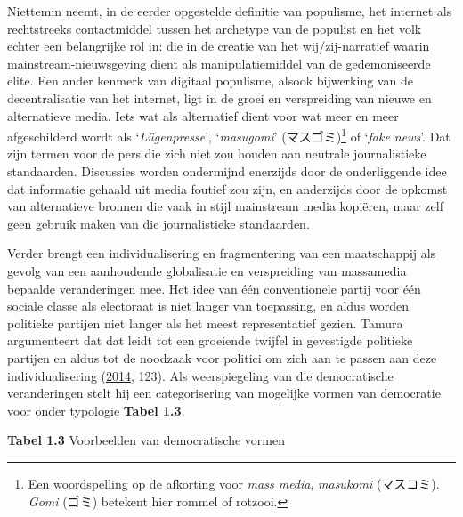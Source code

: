 \documentclass[10.5pt,dutch,]{article}
\begin{document}
Niettemin neemt, in de eerder opgestelde definitie van populisme, het
internet als rechtstreeks contactmiddel tussen het archetype van de
populist en het volk echter een belangrijke rol in: die in de creatie
van het wij/zij-narratief waarin mainstream-nieuwsgeving dient als
manipulatiemiddel van de gedemoniseerde elite. Een ander kenmerk van
digitaal populisme, alsook bijwerking van de decentralisatie van het
internet, ligt in de groei en verspreiding van nieuwe en alternatieve
media. Iets wat als alternatief dient voor wat meer en meer
afgeschilderd wordt als `\emph{Lügenpresse}', `\emph{masugomi}'
(マスゴミ)\footnote{Een woordspelling op de afkorting voor \emph{mass
  media}, \emph{masukomi} (マスコミ). \emph{Gomi} (ゴミ) betekent hier
  rommel of rotzooi.} of `\emph{fake news}'. Dat zijn termen voor de
pers die zich niet zou houden aan neutrale journalistieke standaarden.
Discussies worden ondermijnd enerzijds door de onderliggende idee dat
informatie gehaald uit media foutief zou zijn, en anderzijds door de
opkomst van alternatieve bronnen die vaak in stijl mainstream media
kopiëren, maar zelf geen gebruik maken van die journalistieke
standaarden.

Verder brengt een individualisering en fragmentering van een
maatschappij als gevolg van een aanhoudende globalisatie en verspreiding
van massamedia bepaalde veranderingen mee. Het idee van één
conventionele partij voor één sociale classe als electoraat is niet
langer van toepassing, en aldus worden politieke partijen niet langer
als het meest representatief gezien. Tamura argumenteert dat dat leidt
tot een groeiende twijfel in gevestigde politieke partijen en aldus tot de
noodzaak voor politici om zich aan te passen aan deze individualisering
(\protect\hyperlink{ref-tamuraux5fnigglingux5f2014}{2014}, 123). Als
weerspiegeling van die democratische veranderingen stelt hij een
categorisering van mogelijke vormen van democratie voor onder typologie
\textbf{Tabel 1.3}.

\textbf{Tabel 1.3} Voorbeelden van democratische vormen
\end{document}
